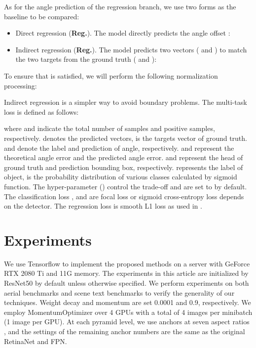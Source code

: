 \documentclass[10pt,journal,compsoc]{IEEEtran}
\begin{document}
As for the angle prediction of the regression branch, we use two forms as the baseline to be compared:
\begin{itemize}
	\item Direct regression (\textbf{Reg.}). The model directly predicts the angle offset :
	
	\item Indirect regression (\textbf{Reg.}). The model predicts two vectors ( and ) to match the two targets from the ground truth ( and ):
	
\end{itemize}
To ensure that  is satisfied, we will perform the following normalization processing:


Indirect regression is a simpler way to avoid boundary problems. The multi-task loss is defined as follows:

where  and  indicate the total number of samples and positive samples, respectively.  denotes the predicted vectors,  is the targets vector of ground truth.  and  denote the label and prediction of angle, respectively.  and  represent the theoretical angle error and the predicted angle error.  and  represent the head of ground truth and prediction bounding box, respectively.  represents the label of object,  is the probability distribution of various classes calculated by sigmoid function. The hyper-parameter  () control the trade-off and are set to  by default. The classification loss ,  and  are focal loss \cite{lin2017focal} or sigmoid cross-entropy loss depends on the detector. The regression loss  is smooth L1 loss as used in \cite{girshick2015fast}.

\section{Experiments}\label{sec:experiments}
We use Tensorflow \cite{abadi2016tensorflow} to implement the proposed methods on a server with GeForce RTX 2080 Ti and 11G memory. The experiments in this article are initialized by ResNet50 \cite{he2016deep} by default unless otherwise specified. We perform experiments on both aerial benchmarks and scene text benchmarks to verify the generality of our techniques. Weight decay and momentum are set 0.0001 and 0.9, respectively. We employ MomentumOptimizer over 4 GPUs with a total of 4 images per minibatch (1 image per GPU). At each pyramid level, we use anchors at seven aspect ratios , and the settings of the remaining anchor numbers are the same as the original RetinaNet and FPN.
\end{document}
